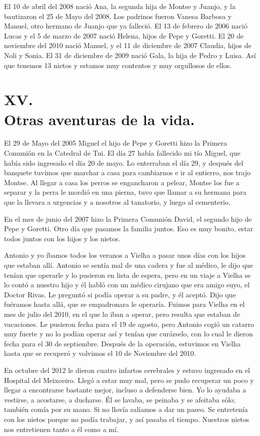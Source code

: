 \documentclass[12pt,a5paper]{book}
\begin{document}
El 10 de abril del 2008 nació Ana, la segunda hija de Montse y Juanjo, y la bautizaron el 25 de Mayo del 2008. Los padrinos fueron Vanesa Barbosa y Manuel, otro hermano de Juanjo que ya falleció. El 13 de febrero de 2006 nació Lucas y el 5 de marzo de 2007 nació Helena, hijos de Pepe y Goretti. El 20 de noviembre del 2010 nació Manuel, y el 11 de diciembre de 2007 Claudia, hijos de Noli y Sonia. El 31 de diciembre de 2009 nació Gala, la hija de Pedro y Luisa. Así que tenemos 13 nietos y estamos muy contentos y muy orgullosos de ellos.


\section*{XV.\\Otras aventuras de la vida.}


El 29 de Mayo del 2005 Miguel el hijo de Pepe y Goretti hizo la Primera Comunión en la Catedral de Tui. El día 27 había fallecido mi tío Miguel, que había sido ingresado el día 20 de mayo. Lo enterraban el día 29, y después del banquete tuvimos que marchar a casa para cambiarnos e ir al entierro, nos trajo Montse. Al llegar a casa los perros se engancharon a pelear, Montse los fue a separar y la perra le mordió en una pierna, tuvo que llamar a su hermana para que la llevara a urgencias y a nosotros al tanatorio, y luego al cementerio.

En el mes de junio del 2007 hizo la Primera Comunión David, el segundo hijo de Pepe y Goretti. Otro día que pasamos la familia juntos. Eso es muy bonito, estar todos juntos con los hijos y los nietos.

Antonio y yo íbamos todos los veranos a Vielha a pasar unos días con los hijos que estaban allí. Antonio se sentía mal de una cadera y fue al médico, le dijo que tenían que operarle y lo pusieron en lista de espera, pero en un viaje a Vielha se lo contó a nuestro hijo y él habló con un médico cirujano que era amigo suyo, el Doctor Rivas. Le preguntó si podía operar a su padre, y él aceptó. Dijo que fuéramos hasta allá, que se empadronara le operaría. Fuimos para Vielha en el mes de julio del 2010, en el que lo iban a operar, pero resulta que estaban de vacaciones. Le pusieron fecha para el 19 de agosto, pero Antonio cogió un catarro muy fuerte y no lo podían operar así y tenían que curárselo, con lo cual le dieron fecha para el 30 de septiembre. Después de la operación, estuvimos en Vielha hasta que se recuperó y volvimos el 10 de Noviembre del 2010.

En octubre del 2012 le dieron cuatro infartos cerebrales y estuvo ingresado en el Hospital del Meixoeiro. Llegó a estar muy mal, pero se pudo recuperar un poco y llegar a encontrarse bastante mejor, incluso a defenderse bien. Yo lo ayudaba a vestirse, a acostarse, a ducharse. Él se lavaba, se peinaba y se afeitaba sólo; también comía por su mano. Si no llovía salíamos a dar un paseo. Se entretenía con los nietos porque no podía trabajar, y así pasaba el tiempo. Nuestros nietos nos entretienen tanto a él como a mí.
\end{document}

